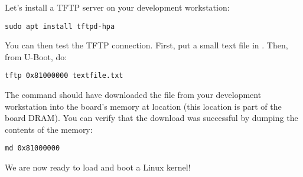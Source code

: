 Let's install a TFTP server on your development workstation:

\begin{verbatim}
sudo apt install tftpd-hpa
\end{verbatim}

You can then test the TFTP connection.  First, put a small text
file in . Then, from U-Boot, do:

\begin{verbatim}
tftp 0x81000000 textfile.txt
\end{verbatim}

The  command should have downloaded the
 file from your development workstation into the
board's memory at location  (this location is part of
the board DRAM). You can verify that the download was successful by
dumping the contents of the memory:

\begin{verbatim}
md 0x81000000
\end{verbatim}

We are now ready to load and boot a Linux kernel!
